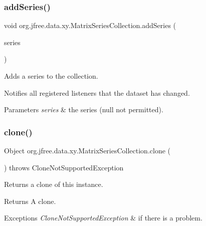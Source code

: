 \subsubsection{\texorpdfstring{add\+Series()}{addSeries()}}
{\footnotesize\ttfamily void org.\+jfree.\+data.\+xy.\+Matrix\+Series\+Collection.\+add\+Series (\begin{DoxyParamCaption}\item[{\mbox{\hyperlink{classorg_1_1jfree_1_1data_1_1xy_1_1_matrix_series}{Matrix\+Series}}}]{series }\end{DoxyParamCaption})}

Adds a series to the collection. 

Notifies all registered listeners that the dataset has changed. 


\begin{DoxyParams}{Parameters}
{\em series} & the series ({\ttfamily null} not permitted). \\
\hline
\end{DoxyParams}
\mbox{\label{classorg_1_1jfree_1_1data_1_1xy_1_1_matrix_series_collection_a630ab760650b152c2cdca21e09ff8ec3}} 
\subsubsection{\texorpdfstring{clone()}{clone()}}
{\footnotesize\ttfamily Object org.\+jfree.\+data.\+xy.\+Matrix\+Series\+Collection.\+clone (\begin{DoxyParamCaption}{ }\end{DoxyParamCaption}) throws Clone\+Not\+Supported\+Exception}

Returns a clone of this instance.

\begin{DoxyReturn}{Returns}
A clone.
\end{DoxyReturn}

\begin{DoxyExceptions}{Exceptions}
{\em Clone\+Not\+Supported\+Exception} & if there is a problem. \\
\hline
\end{DoxyExceptions}
\mbox{\label{classorg_1_1jfree_1_1data_1_1xy_1_1_matrix_series_collection_a0b0e130d35edf160015f7ecc190251b4}} 
